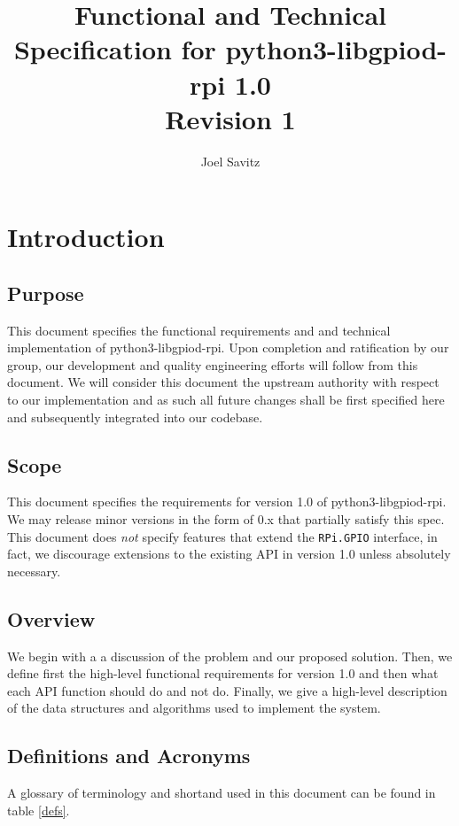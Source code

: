 \documentclass[12pt]{article}
\title{
{Functional and Technical Specification for python3-libgpiod-rpi 1.0} \\
{Revision 1}
}
\author{Joel Savitz}
\begin{document}
\maketitle

\section{Introduction}
\subsection{Purpose}
This document specifies the functional requirements and and technical implementation of python3-libgpiod-rpi. Upon completion and ratification by our group, our development and quality engineering efforts will follow from this document. We will consider this document the upstream authority with respect to our implementation and as such all future changes shall be first specified here and subsequently integrated into our codebase.


\subsection{Scope}
This document specifies the requirements for version 1.0 of python3-libgpiod-rpi. We may release minor versions in the form of 0.x that partially satisfy this spec. This document does \textit{not} specify features that extend the \texttt{RPi.GPIO} interface, in fact, we discourage extensions to the existing API in version 1.0 unless absolutely necessary.


\subsection{Overview}
We begin with a a discussion of the problem and our proposed solution. Then, we define first the high-level functional requirements for version 1.0 and then what each API function should do and not do. Finally, we give a high-level description of the data structures and algorithms used to implement the system.


\subsection{Definitions and Acronyms}

A glossary of terminology and shortand used in this document can be found in table \ref{defs}.
\end{document}
